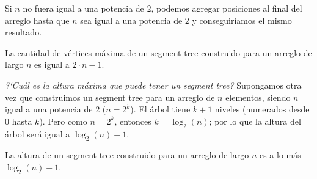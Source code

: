 Si $n$ no fuera igual a una potencia de $2$, podemos agregar posiciones al final del arreglo hasta que $n$ sea igual a una potencia de $2$ y conseguir\'iamos el mismo resultado. 

\begin{property}
    La cantidad de v\'ertices m\'axima de un segment tree construido para un arreglo de largo $n$ es igual a $2\cdot n - 1$.
\end{property}

\hfill \break
\textit{?`Cu\'al es la altura m\'axima que puede tener un segment tree?}
Supongamos otra vez que construimos un segment tree para un arreglo de $n$ elementos, siendo $n$ igual a una potencia de $2$ ($n = 2^k$). El \'arbol tiene $k+1$ niveles (numerados desde $0$ hasta $k$). Pero como $n = 2^k$, entonces $k = \log_2(n)$; por lo que la altura del \'arbol ser\'a igual a $\log_2(n) + 1$.

\begin{property}
    La altura de un segment tree construido para un arreglo de largo $n$ es a lo m\'as $\log_2(n) + 1$.
\end{property}